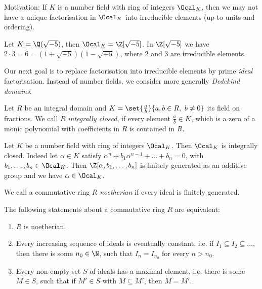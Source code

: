 Motivation: If \( K \) is a number field with ring of integers \( \Ocal_K \), then we may not have a unique factorisation in \( \Ocal_K \) into irreducible elements (up to units and ordering).

\begin{exmp*}
	Let \( K = \Q(\sqrt{-5}) \), then \( \Ocal_K = \Z[\sqrt{-5}] \).
	In \( \Z[\sqrt{-5}] \) we have \( 2 \cdot 3 = 6 = (1+\sqrt{-5})(1-\sqrt{-5}) \), where 2 and 3 are irreducible elements.
\end{exmp*}

Our next goal is to replace factorisation into irreducible elements by prime \emph{ideal} factorisation.
Instead of number fields, we consider more generally \emph{Dedekind domains}.

\begin{defn*}
	Let \( R \) be an integral domain and \( K = \set{\frac{a}{b}}{a,b \in R,\ b \neq 0} \) its field on fractions.
	We call \( R \) \emph{integrally closed}, if every element \( \frac{a}{b} \in K \), which is a zero of a monic polynomial with coefficients in \( R \) is contained in \( R \).
\end{defn*}

\begin{exmp*}
	Let \( K \) be a number field with ring of integers \( \Ocal_K \).
	Then \( \Ocal_K \) is integrally closed.
	Indeed let \( \alpha \in K \) satisfy \( \alpha^n + b_1\alpha^{n-1} + \dots + b_n = 0 \), with \( b_1, \dotsc, b_n \in \Ocal_K \).
	Then \( \Z[\alpha, b_1, \dotsc, b_n] \) is finitely generated as an additive group and we have \( \alpha \in \Ocal_K \).
\end{exmp*}

\begin{defn*}
	We call a commutative ring \( R \) \emph{noetherian} if every ideal is finitely generated.
\end{defn*}

\begin{rem*}
	The following statements about a commutative ring \( R \) are equivalent:
	\begin{enumerate}
		\item \( R \) is noetherian.
		\item Every increasing sequence of ideals is eventually constant, i.e. if \( I_1 \subseteq I_2 \subseteq \dots \), then there is some \( n_0 \in \N \), such that \( I_n = I_{n_0} \) for every \( n > n_0 \).
		\item Every non-empty set \( S \) of ideals has a maximal element, i.e. there is some \( M \in S \), such that if \( M' \in S \) with \( M \subseteq M' \), then \( M = M' \).
	\end{enumerate}
\end{rem*}

